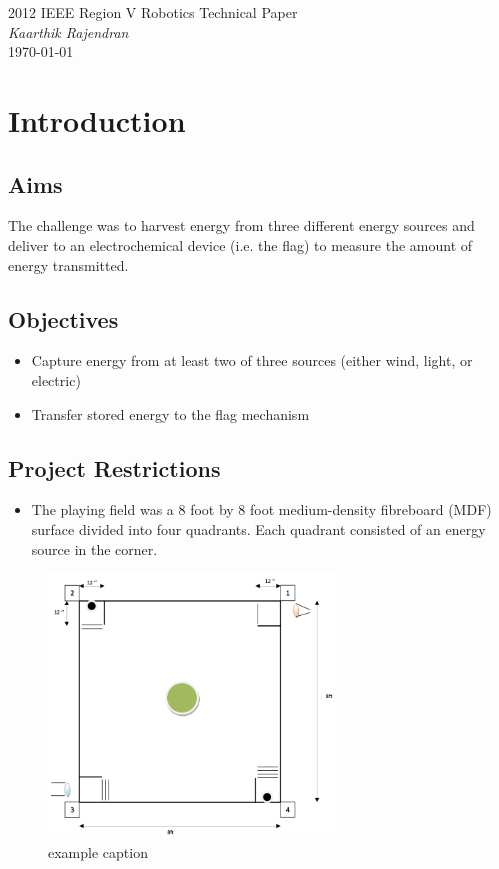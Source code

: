 \documentclass[12pt]{article}
\begin{document}



{\Huge 2012 IEEE Region V Robotics Technical Paper}\\[\baselineskip]
{\large\itshape Kaarthik Rajendran }\\[\baselineskip]
\today 

\section{Introduction}
\subsection{Aims}
The challenge was to harvest energy from three different energy sources and deliver to an electrochemical device (i.e. the flag) to measure the amount of energy transmitted. 

\subsection{Objectives}
\begin{itemize}
	\item Capture energy from at least two of three sources (either wind, light, or electric)
	\item Transfer stored energy to the flag mechanism
\end{itemize}
\subsection{Project Restrictions}
\begin{itemize}
	\item The playing field was a 8 foot by 8 foot medium-density fibreboard (MDF) surface divided into four quadrants. Each quadrant consisted of an energy source in the corner. 
\end{itemize}

\begin{figure}[htbp] %
   \centering
   \includegraphics[width=3in]{Robotics2012PlayingField} 
   \caption{example caption}
   \label{fig:example}
\end{figure}
\end{document}

